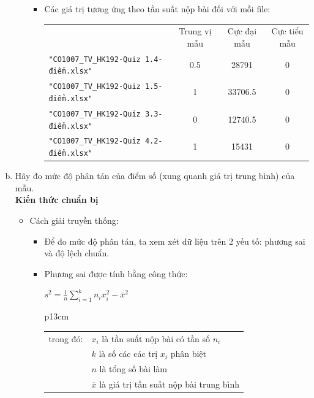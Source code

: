 \documentclass[a4paper]{article}
\theoremstyle{definition}
\begin{document}
\begin{enumerate}[a)]
\begin{itemize}
        \begin{itemize}
            \item Các giá trị tương ứng theo tần suất nộp bài đối với mỗi file:
            \begin{center}
                \begin{tabular}{l c c c}
                     & Trung vị mẫu & Cực đại mẫu & Cực tiểu mẫu\\
                     \texttt{"CO1007\_TV\_HK192-Quiz 1.4-điểm.xlsx"} & 0.5 & 28791 & 0\\ 
                     \texttt{"CO1007\_TV\_HK192-Quiz 1.5-điểm.xlsx"} & 1 & 33706.5 & 0\\ 
                     \texttt{"CO1007\_TV\_HK192-Quiz 3.3-điểm.xlsx"} & 0 & 12740.5 & 0\\ 
                     \texttt{"CO1007\_TV\_HK192-Quiz 4.2-điểm.xlsx"} & 1 & 15431 & 0\\ 
                \end{tabular}
            \end{center}
        \end{itemize}
    \end{itemize}
    \bf\item Hãy đo mức độ phân tán của điểm số (xung quanh giá trị trung bình) của  mẫu.\\[6pt]
    \bf Kiến thức chuẩn bị\normalfont
    \begin{itemize}
        \item Cách giải truyền thống:
        \begin{itemize}
            \item Để đo mức độ phân tán, ta xem xét dữ liệu trên 2 yếu tố: phương sai và độ lệch chuẩn.
            \item Phương sai được tính bằng công thức:
            \begin{center}
                $s^2 = \frac{1}{n} \sum \limits_{i=1}^{k} n_i x_i^2 - \overline{x}^2$
                \begin{tabular}{p{13cm}}
                    \begin{tabular}{l l}
                        trong đó: & $x_i$ là tần suất nộp bài có tần số $n_i$\\
                        & $k$ là số các các trị $x_i$ phân biệt\\
                        & $n$ là tổng số bài làm\\
                        & $\overline{x}$ là giá trị tần suất nộp bài trung bình
                    \end{tabular}

\end{tabular}
\end{center}
\end{itemize}
\end{itemize}
\end{enumerate}
\end{document}

